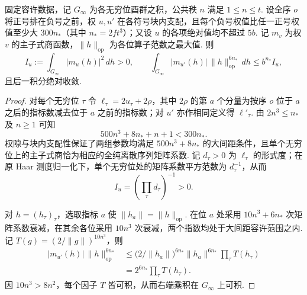 \begin{lemma}[大权隙下主子式商的加权积分]
\label{lem:c-kernel-weighted-integral}
\emitthmsource
固定容许数据，记 $G_\infty$ 为各无穷位酉群之积，公共秩 $n$ 满足 $1\le n\le t$. 设全序 $o$ 将正号排在负号之前，权 $u,u'$ 在各符号块内支配，且每个负号权值比任一正号权值至少大 $300n_*$（其中 $n_*=2ft^3$）；又设 $u$ 的各项绝对值均不超过 $5b$. 记 $m_v$ 为权 $v$ 的主子式商函数，$\|h\|_{\mathrm{op}}$ 为各位算子范数之最大值. 则
\[
  I_u:=\int_{G_\infty}|m_u(h)|^2\,dh>0,
  \qquad
  \int_{G_\infty}|m_{u'}(h)|\,\|h\|_{\mathrm{op}}^{6n_*}\,dh
       \le b^{n_*}I_u,
\]
且后一积分绝对收敛.
\end{lemma}

\begin{proof}
对每个无穷位 $\tau$ 令 $\ell_\tau=2u_\tau+2\rho$，其中 $2\rho$ 的第 $a$ 个分量为按序 $o$ 位于 $a$ 之后的指标数减去位于 $a$ 之前的指标数；对 $u'$ 亦作相同定义得 $\ell'_\tau$. 由 $2n^3\le n_*$ 及 $n\ge1$ 可知
\[
 500n^3+8n_*+n+1<300n_*.
\]
权隙与块内支配性保证了两组参数均满足 $500n^3+8n_*$ 的大间距条件，且单个无穷位上的主子式商恰为相应的全纯离散序列矩阵系数. 记 $d_\tau>0$ 为 $\ell_\tau$ 的形式度；在原 Haar 测度归一化下，单个无穷位处的矩阵系数平方范数为 $d_\tau^{-1}$，从而
\[
   I_u=\left(\prod_\tau d_\tau\right)^{-1}>0 .
\]

对 $h=(h_\tau)_\tau$，选取指标 $a$ 使 $\|h_a\|=\|h\|_{\mathrm{op}}$. 在位 $a$ 处采用 $10n^3+6n_*$ 次矩阵系数衰减，在其余各位采用 $10n^3$ 次衰减，两个指数均处于大间距容许范围之内. 记 $T(g)=(2/\|g\|)^{10n^3}$，则
\[
 \begin{aligned}
 |m_{u'}(h)|\,\|h\|_{\mathrm{op}}^{6n_*}
 &\le \bigl(2/\|h_a\|\bigr)^{6n_*}
               \|h_a\|^{6n_*}\prod_\tau T(h_\tau)\\
 &=2^{6n_*}\prod_\tau T(h_\tau).
 \end{aligned}
\]
因 $10n^3>8n^2$，每个因子 $T$ 皆可积，从而右端乘积在 $G_\infty$ 上可积.


\end{proof}
